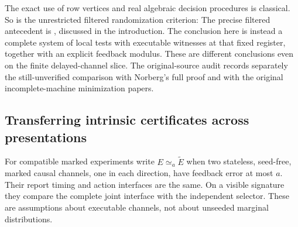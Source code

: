 The exact use of row vertices and real algebraic decision procedures
is classical. So is the unrestricted filtered randomization criterion:
The precise filtered antecedent is
\cite[Lemma 1 and Theorem 5]{Weisshaupt2002}, discussed in the introduction. The conclusion here is instead a complete system
of local tests with executable witnesses at that fixed register, together
with an explicit feedback modulus. These are different conclusions even
on the finite delayed-channel slice. The original-source audit records
separately the still-unverified comparison with Norberg's full proof and
with the original incomplete-machine minimization papers.

\subsection{Transferring intrinsic certificates across presentations}
\label{sec:v14-stability}
For compatible marked experiments write
$E\simeq_a\widetilde E$ when two stateless, seed-free, marked causal
channels, one in each direction, have feedback error at most $a$.
Their report timing and action interfaces are the same. On a visible
signature they compare the complete joint interface with the independent
selector. These are assumptions about executable channels, not about
unseeded marginal distributions.

